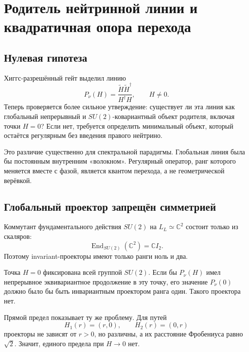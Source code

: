 \chapter{Родитель нейтринной линии и квадратичная опора перехода}
\label{ch:v6-spectral-transition-neutrino-line-parent-gate}

\section{Нулевая гипотеза}

Хиггс-разрешённый гейт выделил линию
\begin{equation}
 P_\nu(H)=
 \frac{\widetilde H\widetilde H^\dagger}{H^\dagger H},
 \qquad H\ne0.
 \label{eq:v6-neutrino-normalized-line}
\end{equation}
Теперь проверяется более сильное утверждение: существует ли эта линия как
глобальный непрерывный и $SU(2)$-ковариантный объект родителя, включая
точки $H=0$? Если нет, требуется определить минимальный объект, который
остаётся регулярным без введения правого нейтрино.

Это различие существенно для спектральной парадигмы. Глобальная линия
была бы постоянным внутренним «волокном». Регулярный оператор, ранг
которого меняется вместе с фазой, является квантом перехода, а не
геометрической верёвкой.

\section{Глобальный проектор запрещён симметрией}

Коммутант фундаментального действия $SU(2)$ на $L_L\simeq\mathbb C^2$
состоит только из скаляров:
\begin{equation}
 \operatorname{End}_{SU(2)}(\mathbb C^2)=\mathbb C I_2.
\end{equation}
Поэтому invariant-проекторы имеют только ранги ноль и два.

Точка $H=0$ фиксирована всей группой $SU(2)$. Если бы
$P_\nu(H)$ имел непрерывное эквивариантное продолжение в эту точку, его
значение $P_\nu(0)$ должно было бы быть инвариантным проектором ранга
один. Такого проектора нет.

Прямой предел показывает ту же проблему. Для путей
\begin{equation}
 H_1(r)=(r,0),\qquad H_2(r)=(0,r)
\end{equation}
проекторы не зависят от $r>0$, но различны, а их расстояние Фробениуса
равно $\sqrt2$. Значит, единого предела при $H\to0$ нет.

